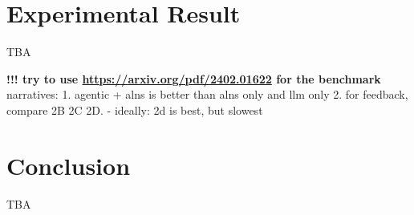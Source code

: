 \documentclass{ecai}
\newtheorem{theorem}{Theorem}
\begin{document}
\section{Experimental Result}
TBA

\textbf{!!! try to use \url{https://arxiv.org/pdf/2402.01622} for the benchmark}
narratives:
1. agentic + alns is better than alns only and llm only
2. for feedback, compare 2B 2C 2D.
    - ideally: 2d is best, but slowest

\section{Conclusion}
TBA






 





\end{document}
